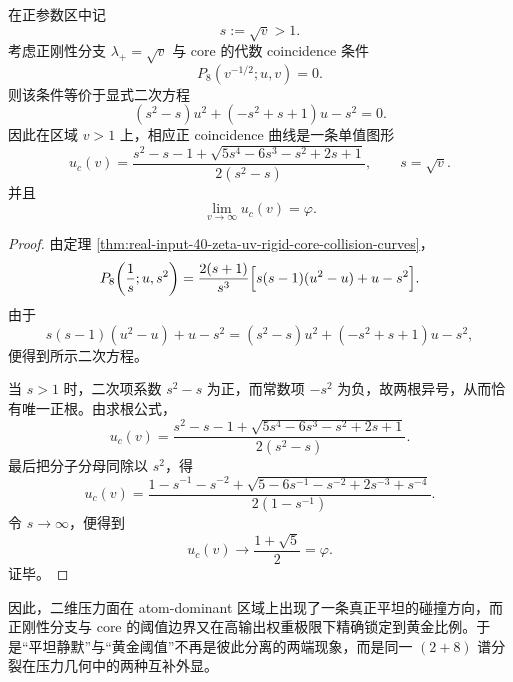 \begin{theorem}\label{thm:conclusion-realinput40-uv-positive-branch-golden-limit}
在正参数区中记
\[
s:=\sqrt v>1.
\]
考虑正刚性分支 \(\lambda_+=\sqrt v\) 与 core 的代数 coincidence 条件
\[
P_8(v^{-1/2};u,v)=0.
\]
则该条件等价于显式二次方程
\[
\boxed{\;
(s^2-s)u^2+(-s^2+s+1)u-s^2=0.\;}
\]
因此在区域 \(v>1\) 上，相应正 coincidence 曲线是一条单值图形
\[
\boxed{\;
u_c(v)
=
\frac{s^2-s-1+\sqrt{5s^4-6s^3-s^2+2s+1}}{2(s^2-s)},
\qquad
s=\sqrt v.\;}
\]
并且
\[
\boxed{\;
\lim_{v\to\infty}u_c(v)=\varphi.\;}
\]
\end{theorem}
\begin{proof}
由定理 \ref{thm:real-input-40-zeta-uv-rigid-core-collision-curves}，
\[
P_8\!\left(\frac1s;u,s^2\right)
=
\frac{2(s+1)}{s^3}\Bigl[s(s-1)(u^2-u)+u-s^2\Bigr].
\]
由于
\[
s(s-1)(u^2-u)+u-s^2
=
(s^2-s)u^2+(-s^2+s+1)u-s^2,
\]
便得到所示二次方程。

当 \(s>1\) 时，二次项系数 \(s^2-s\) 为正，而常数项 \(-s^2\) 为负，故两根异号，从而恰有唯一正根。由求根公式，
\[
u_c(v)
=
\frac{s^2-s-1+\sqrt{5s^4-6s^3-s^2+2s+1}}{2(s^2-s)}.
\]
最后把分子分母同除以 \(s^2\)，得
\[
u_c(v)
=
\frac{1-s^{-1}-s^{-2}+\sqrt{5-6s^{-1}-s^{-2}+2s^{-3}+s^{-4}}}{2(1-s^{-1})}.
\]
令 \(s\to\infty\)，便得到
\[
u_c(v)\longrightarrow \frac{1+\sqrt5}{2}=\varphi.
\]
证毕。
\end{proof}

\noindent
因此，二维压力面在 atom-dominant 区域上出现了一条真正平坦的碰撞方向，而正刚性分支与 core 的阈值边界又在高输出权重极限下精确锁定到黄金比例。于是“平坦静默”与“黄金阈值”不再是彼此分离的两端现象，而是同一 \((2+8)\) 谱分裂在压力几何中的两种互补外显。

\endinput

